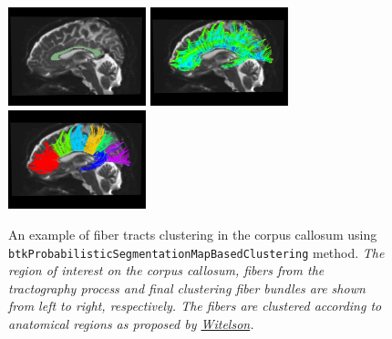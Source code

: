 \begin{description}
	\begin{figure}[h]
	\centering
        \includegraphics[width=4cm]{Corpus_Callosum-view2}
        \includegraphics[width=4cm]{Tractography-CC-view2}
        \includegraphics[width=4cm]{Clustering2-CC-view2}
        \caption{An example of fiber tracts clustering in the corpus callosum using \texttt{btkProbabilisticSegmentationMapBasedClustering} method.
        {\em The region of interest on the corpus callosum, fibers from the tractography process and final clustering fiber bundles are shown from left to right, respectively. The fibers are clustered according to anatomical regions as proposed by \href{brain.oxfordjournals.org/content/112/3/799}{Witelson}.}}
        \label{clustering2-fig}
        \end{figure}

\end{description}
